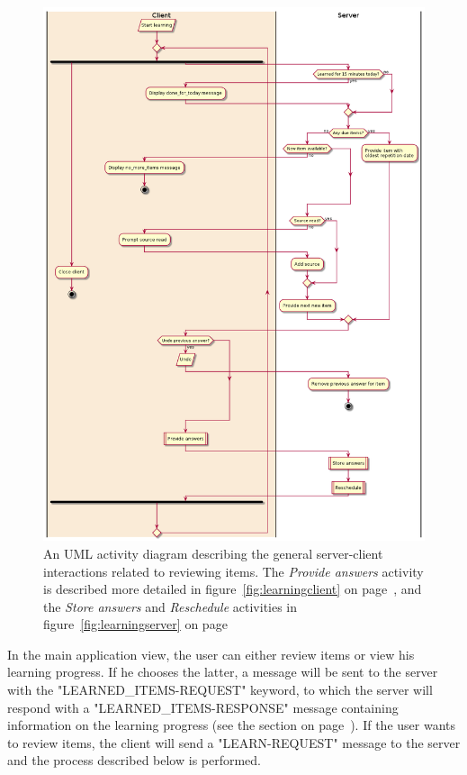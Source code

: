 \begin{figure}
\centering
\includegraphics[width=.9\textwidth]{img/learningactivitygen.png}
    \caption{An UML activity diagram describing the general server-client interactions related to reviewing items. The \protect\emph{Provide answers} activity is described more detailed in figure~\protect\ref{fig:learningclient} on page~\protect\pageref{fig:learningclient}, and the \protect\emph{Store answers} and \protect\emph{Reschedule} activities in figure~\protect\ref{fig:learningserver} on page~\protect\pageref{fig:learningserver}}
\label{fig:learningactivitygen}
\end{figure}

In the main application view, the user can either review items or view his learning progress. If he chooses the latter, a message will be sent to the server with the "LEARNED\_ITEMS-REQUEST" keyword, to which the server will respond with a "LEARNED\_ITEMS-RESPONSE" message containing information on the learning progress (see the  section on page~\pageref{sec:learningprogress}). If the user wants to review items, the client will send a "LEARN-REQUEST" message to the server and the process described below is performed.

